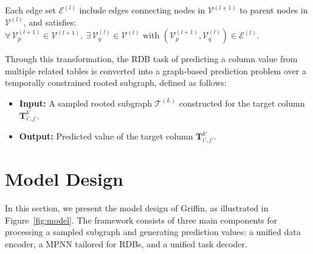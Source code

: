 \documentclass{article}
\theoremstyle{plain}
\theoremstyle{definition}
\theoremstyle{remark}
\begin{document}
Each edge set $\mathcal{E}^{(l)}$ include edges connecting nodes in $\mathcal{V}^{(l+1)}$ to parent nodes in $\mathcal{V}^{(l)}$, and satisfies:
$\forall\, \mathcal{V}^{(l+1)}_p \in \mathcal{V}^{(l+1)},\ \exists\, \mathcal{V}^{(l)}_q \in \mathcal{V}^{(l)} \text{ with } (\mathcal{V}^{(l+1)}_p, \mathcal{V}^{(l)}_q) \in \mathcal{E}^{(l)}$.

Through this transformation, the RDB task of predicting a column value from multiple related tables is converted into a graph-based prediction problem over a temporally constrained rooted subgraph, defined as follows:

\begin{itemize}
[itemsep=2pt,topsep=-2pt,parsep=0pt,leftmargin=10pt]
\item \textbf{Input:} A sampled rooted subgraph $\mathcal{T}^{(L)}$ constructed for the target column $\bm{T}^{k’}_{i’, j’}$.
\item \textbf{Output:} Predicted value of the target column $\bm{T}^{k’}_{i’, j’}$.
\end{itemize}


\section{Model Design}



In this section, we present the model design of Griffin, as illustrated in Figure~\ref{fig:model}. The framework consists of three main components for processing a sampled subgraph and generating prediction values: a unified data encoder, a MPNN tailored for RDBs, and a unified task decoder.
\end{document}

